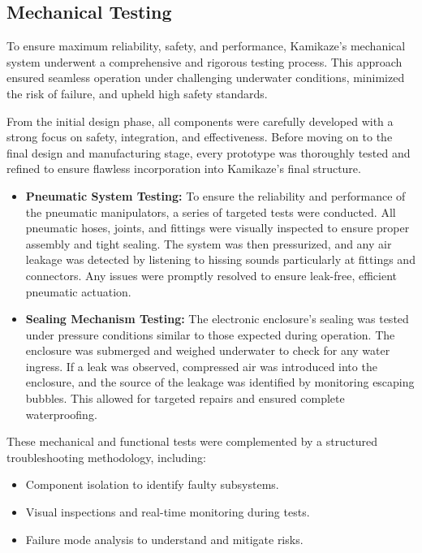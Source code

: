 \subsection{Mechanical Testing}

To ensure maximum reliability, safety, and performance, Kamikaze’s mechanical system underwent a comprehensive and rigorous testing process. This approach ensured seamless operation under challenging underwater conditions, minimized the risk of failure, and upheld high safety standards.

\hspace{10pt} From the initial design phase, all components were carefully developed with a strong focus on safety, integration, and effectiveness. Before moving on to the final design and manufacturing stage, every prototype was thoroughly tested and refined to ensure flawless incorporation into Kamikaze’s final structure.

\vspace{-0.5\baselineskip}
\begin{itemize}
    \setlength{\itemsep}{0pt}
    \item \textbf{Pneumatic System Testing:} To ensure the reliability and performance of the pneumatic manipulators, a series of targeted tests were conducted. All pneumatic hoses, joints, and fittings were visually inspected to ensure proper assembly and tight sealing. The system was then pressurized, and any air leakage was detected by listening to hissing sounds particularly at fittings and connectors. Any issues were promptly resolved to ensure leak-free, efficient pneumatic actuation.
    \item \textbf{Sealing Mechanism Testing:} The electronic enclosure's sealing was tested under pressure conditions similar to those expected during operation. The enclosure was submerged and weighed underwater to check for any water ingress. If a leak was observed, compressed air was introduced into the enclosure, and the source of the leakage was identified by monitoring escaping bubbles. This allowed for targeted repairs and ensured complete waterproofing.
\end{itemize}

These mechanical and functional tests were complemented by a structured troubleshooting methodology, including:

\vspace{-0.5\baselineskip}
\begin{itemize}
    \setlength{\itemsep}{0pt}
    \item Component isolation to identify faulty subsystems.
    \item Visual inspections and real-time monitoring during tests.
    \item Failure mode analysis to understand and mitigate risks.
\end{itemize}